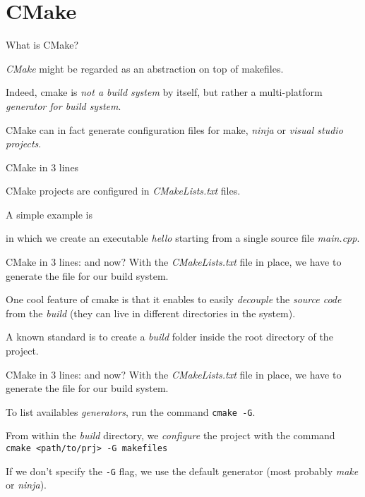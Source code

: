 \section{CMake}
\begin{frame}{What is CMake?}

    \emph{CMake} might be regarded as an abstraction on top of makefiles.

    Indeed, cmake is \emph{not a build system} by itself, but rather a multi-platform \emph{generator for build system}.

    CMake can in fact generate configuration files for make, \textit{ninja} or \textit{visual studio projects}.
    
\end{frame}

\begin{frame}[fragile]{CMake in 3 lines}

    CMake projects are configured in \emph{CMakeLists.txt} files.

    A simple example is
    
    in which we create an executable \textit{hello} starting from a single source file \textit{main.cpp}.

\end{frame}

\begin{frame}[fragile]{CMake in 3 lines: and now?}
    With the \textit{CMakeLists.txt} file in place, we have to generate the file for our build system.

    One cool feature of cmake is that it enables to easily \emph{decouple} the \emph{source code} from the \emph{build} (they can live in different directories in the system).

    A known standard is to create a \textit{build} folder inside the root directory of the project.
\end{frame}

\begin{frame}[fragile]{CMake in 3 lines: and now?}
    With the \textit{CMakeLists.txt} file in place, we have to generate the file for our build system.

    To list availables \emph{generators}, run the command \texttt{cmake -G}. 

    From within the \textit{build} directory, we \emph{configure} the project with the command\\
    \texttt{cmake <path/to/prj> -G makefiles}

    If we don't specify the \texttt{-G} flag, we use the default generator (most probably \textit{make} or \textit{ninja}).

\end{frame}

